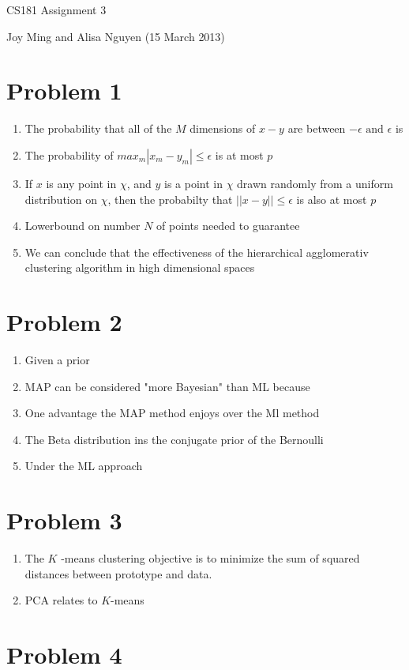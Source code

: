 \documentclass[11pt]{article}
\begin{document}
\begin{center}
\large
CS181 Assignment 3
\end{center}
Joy Ming and Alisa Nguyen (15 March 2013)\\

\section{Problem 1}
\begin{enumerate}
\item The probability that all of the $M$ dimensions of $x - y$ are between $-\epsilon \text{ and } \epsilon$ is
\item The probability of $max_m |x_m - y_m| \leq \epsilon$ is at most $p$
\item If $x$ is any point in $\chi$, and $y$ is a point in $\chi$ drawn randomly from a uniform distribution on $\chi$, then the probabilty that $||x - y|| \leq \epsilon$ is also at most $p$
\item Lowerbound on number $N$ of points needed to guarantee
\item We can conclude that the effectiveness of the hierarchical agglomerativ clustering algorithm in high dimensional spaces
\end{enumerate}

\section{Problem 2}
\begin{enumerate}
\item Given a prior
\item MAP can be considered "more Bayesian" than ML because
\item One advantage the MAP method enjoys over the Ml method
\item The Beta distribution ins the conjugate prior of the Bernoulli
\item Under the ML approach
\end{enumerate}

\section{Problem 3}
\begin{enumerate}
\item The $K$ -means clustering objective is to minimize the sum of squared distances between prototype and data.
\item PCA relates to $K$-means
\end{enumerate}

\section{Problem 4}
\end{document}
